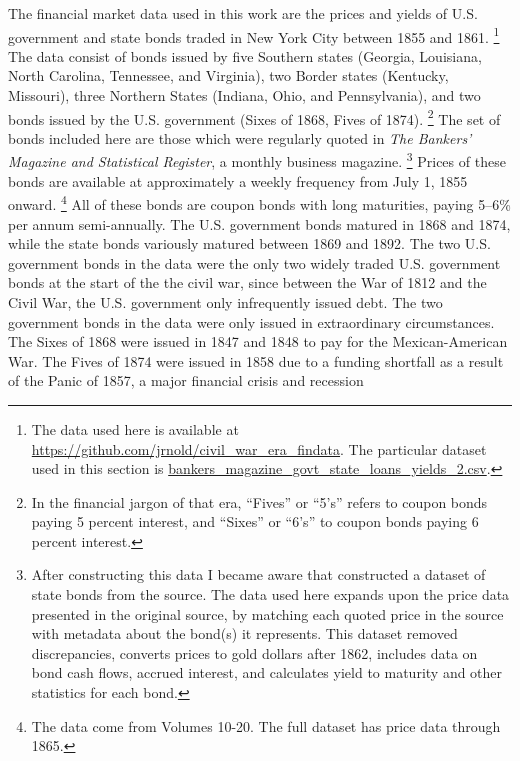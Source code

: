 \documentclass[]{article}\usepackage[]{graphicx}\usepackage[]{color}
\begin{document}
The financial market data used in this work are the prices and yields of U.S. government and state bonds traded in New York City between 1855 and 1861.%
\footnote{
  The data used here is available at \url{https://github.com/jrnold/civil_war_era_findata}.
  The particular dataset used in this section is \href{https://github.com/jrnold/civil_war_era_findata/blob/master/data/bankers_magazine_govt_state_loans_yields_2.csv}{bankers\_magazine\_govt\_state\_loans\_yields\_2.csv}.
}
The data consist of bonds issued by five Southern states (Georgia, Louisiana, North Carolina, Tennessee, and Virginia), two Border states (Kentucky, Missouri), three Northern States (Indiana, Ohio, and Pennsylvania), and two bonds issued by the U.S. government (Sixes of 1868, Fives of 1874).%
\footnote{In the financial jargon of that era, ``Fives'' or ``5's'' refers to coupon bonds paying 5 percent interest, and ``Sixes'' or ``6's'' to coupon bonds paying 6 percent interest.}
The set of bonds included here are those which were regularly quoted in \textit{The Bankers' Magazine and Statistical Register}, a monthly business magazine.%
\footnote{After constructing this data I became aware that \textcite{DwyerHaferWeber1999} constructed a dataset of state bonds from the source.
  The data used here expands upon the price data presented in the original source, by matching each quoted price in the source with metadata about the bond(s) it represents.
  This dataset removed discrepancies, converts prices to gold dollars after 1862, includes data on bond cash flows, accrued interest, and calculates yield to maturity and other statistics for each bond.
}
Prices of these bonds are available at approximately a weekly frequency from July  1, 1855 onward.%
\footnote{The data come from Volumes 10-20. The full dataset has price data through 1865.}
All of these bonds are coupon bonds with long maturities, paying 5--6\% per annum semi-annually.
The U.S. government bonds matured in 1868 and 1874, while the state bonds variously matured between 1869 and 1892.
The two U.S. government bonds in the data were the only two widely traded U.S. government bonds at the start of the the civil war, since between the War of 1812 and the Civil War, the U.S. government only infrequently issued debt.
The two government bonds in the data were only issued in extraordinary circumstances. 
The Sixes of 1868 were issued in 1847 and 1848 to pay for the Mexican-American War.
The Fives of 1874 were issued in 1858 due to a funding shortfall as a result of the Panic of 1857, a major financial crisis and recession  \parencites[297-302]{HomerSylla2005}[72-73,76]{DeKnight1900}
\end{document}
